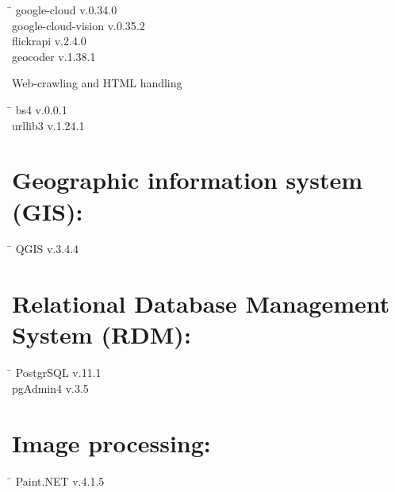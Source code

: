  \begin{tabbing}
  \hspace*{5cm}  \= \kill
  google-cloud \> v.0.34.0 \\
  google-cloud-vision \> v.0.35.2 \\
  flickrapi \> v.2.4.0 \\
  geocoder \> v.1.38.1
 \end{tabbing}
\begin{large}Web-crawling and HTML handling\end{large}
 \begin{tabbing}
  \hspace*{5cm}  \= \kill
   bs4 \> v.0.0.1 \\
   urllib3 \> v.1.24.1 \\
 \end{tabbing}
 
 \section*{Geographic information system (GIS):}
  \begin{tabbing}
  \hspace*{5cm}  \= \kill
   QGIS \> v.3.4.4
 \end{tabbing}
 \section*{Relational Database Management System (RDM):}
  \begin{tabbing}
  \hspace*{5cm}  \= \kill
   PostgrSQL \> v.11.1 \\
   pgAdmin4 \> v.3.5
 \end{tabbing}
 
 \section*{Image processing:}
  \begin{tabbing}
  \hspace*{5cm}  \= \kill
   Paint.NET \> v.4.1.5
 \end{tabbing}

 
 
 
 
 
 
 
 
 
 
 
 
 
 
 
 

